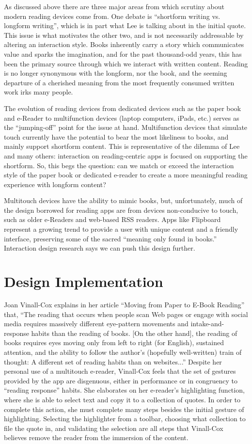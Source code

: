\documentclass[11pt, oneside]{article}   	%
\begin{document}
As discussed above there are three major areas from which scrutiny about modern reading devices come from. One debate is ``shortform writing vs. longform writing'', which is in part what Lee is talking about in the initial quote. This issue is what motivates the other two, and is not necessarily addressable by altering an interaction style. Books inherently carry a story which communicates value and sparks the imagination, and for the past thousand-odd years, this has been the primary source through which we interact with written content. Reading is no longer synonymous with the longform, nor the book, and the seeming departure of a cherished meaning from the most frequently consumed written work irks many people.

The evolution of reading devices from dedicated devices such as the paper book and e-Reader to multifunction devices (laptop computers, iPads, etc.) serves as the ``jumping-off'' point for the issue at hand. Multifunction devices that simulate touch currently have the potential to bear the most likeliness to books, and mainly support shortform content. This is representative of the dilemma of Lee and many others: interaction on reading-centric apps is focused on supporting the shortform. So, this begs the question: can we match or exceed the interaction style of the paper book or dedicated e-reader to create a more meaningful reading experience with longform content?

Multitouch devices have the ability to mimic books, but, unfortunately, much of the design borrowed for reading apps are from devices non-conducive to touch, such as older e-Readers and web-based RSS readers. Apps like Flipboard represent a growing trend to provide a user with unique content and a friendly interface, preserving some of the sacred ``meaning only found in books.'' Interaction design research says we can push this design further.

\section{Design Implementation}
Joan Vinall-Cox explains in her article ``Moving from Paper to E-Book Reading'' that, ``The reading that occurs when people scan Web pages or engage with social media requires massively different eye-pattern movements and intake-and-response habits than the reading of books. [On the other hand], the reading of books requires eyes moving only from left to right (for English), sustained attention, and the ability to follow the author's (hopefully well-written) train of thought: A different set of reading habits than on websites...'' Despite her personal use of a multitouch e-reader, Vinall-Cox feels that the set of gestures provided by the app are disgenuous, either in performance or in congruency to ``reading response'' habits. She elaborates on her e-reader's highlighting function, where she is able to select text and copy it to a collection of quotes. In order to complete this action, she must complete many steps besides the initial gesture of highlighting. Selecting the highlighter from a toolbar, choosing what collection to file the quote in, and validating the selection are all steps that Vinall-Cox believes remove the reader from the immersion of the content.
\end{document}
